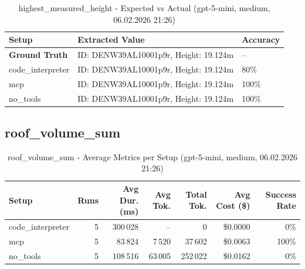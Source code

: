 \documentclass[a4paper,11pt]{article}
\begin{document}
\begin{table}[H]
\centering
\scriptsize
\caption{highest\_measured\_height - Expected vs Actual (gpt-5-mini, medium, 06.02.2026 21:26)}
\begin{tabular}{l l l}
\toprule
Setup & Extracted Value & Accuracy \\
\midrule
\textbf{Ground Truth} & ID: DENW39AL10001p9r, Height: 19.124m & -- \\
\midrule
code\_interpreter & ID: DENW39AL10001p9r, Height: 19.124m & 80\% \\
mcp & ID: DENW39AL10001p9r, Height: 19.124m & 100\% \\
no\_tools & ID: DENW39AL10001p9r, Height: 19.124m & 100\% \\
\bottomrule
\end{tabular}
\end{table}

\clearpage

\subsection{roof\_volume\_sum}

\begin{table}[H]
\centering
\scriptsize
\caption{roof\_volume\_sum - Average Metrics per Setup (gpt-5-mini, medium, 06.02.2026 21:26)}
\label{tab:combined\_roof\_volume\_sum\_metrics\_20260206}
\begin{tabular}{l r r r r r r}
\toprule
Setup & Runs & Avg Dur. (ms) & Avg Tok. & Total Tok. & Avg Cost (\$) & Success Rate \\
\midrule
code\_interpreter & 5 & 300\,028 & -- & 0 & \$0.0000 & 0\% \\
mcp & 5 & 83\,824 & 7\,520 & 37\,602 & \$0.0063 & 100\% \\
no\_tools & 5 & 108\,516 & 63\,005 & 252\,022 & \$0.0162 & 0\% \\
\bottomrule
\end{tabular}
\end{table}
\end{document}
